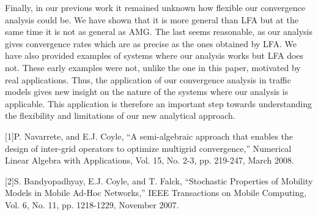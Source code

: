 \documentclass{report}
\begin{document}
Finally, in our previous work it remained unknown how flexible our
convergence analysis could be. We have shown that it is more general than
LFA but at the same time it is not as general as AMG. The last seems
reasonable, as our analysis gives convergence rates which are as precise
as the ones obtained by LFA. We have also provided examples of systems
where our analysis works but LFA does not. These early examples were not,
unlike the one in this paper, motivated by real applications. Thus, the
application of our convergence analysis in traffic models gives new
insight on the nature of the systems where our analysis is applicable.
This application is therefore an important step towards understanding the
flexibility and limitations of our new analytical approach.

[1]P. Navarrete, and E.J. Coyle, ``A semi-algebraic approach that enables
the design of inter-grid operators to optimize multigrid convergence,''
Numerical Linear Algebra with Applications, Vol. 15, No. 2-3, pp.
219-247, March 2008.

[2]S. Bandyopadhyay, E.J. Coyle, and T. Falck, ``Stochastic Properties of
Mobility Models in Mobile Ad-Hoc Networks,'' IEEE Transactions on Mobile
Computing, Vol. 6, No. 11, pp. 1218-1229, November 2007.
\end{document}
